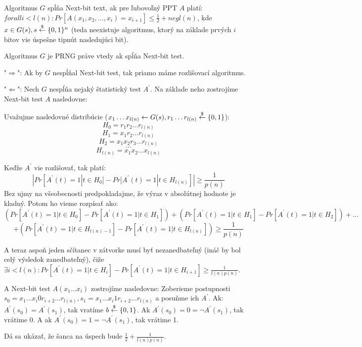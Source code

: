 \begin{definicia}
Algoritmus $G$ spĺňa Next-bit text, ak pre ľubovoľný PPT $A$ platí:
$forall i < l(n)\colon Pr[A(x_1, x_2, \dots, x_i) = x_{i+1}] \leq \frac{1}{2} + negl(n)$, kde
$x \in G(s), s \overset{\$}{\leftarrow} \{0,1\}^n$ (teda neexistuje algoritmus, ktorý na základe
prvých $i$ bitov vie úspešne tipnút nasledujúci bit).
\end{definicia}

\begin{veta}
Algoritmus $G$ je PRNG práve vtedy ak spĺňa Next-bit test.
\end{veta}

\begin{dokaz}
"$\Rightarrow$": Ak by $G$ nespĺňal Next-bit test, tak priamo máme rozlišovací algoritmus.

"$\Leftarrow$": Nech $G$ nespĺňa nejaký štatistický test $A^{'}$. Na základe neho zostrojíme Next-bit
test $A$ nasledovne:

Uvažujme nasledovné distribúcie ($x_1 \dots x_{l(n)} \leftarrow G(s), r_1 \dots r_{l(n)} \overset{\$}{\leftarrow} \{0,1\}$):
$$H_0 = r_1 r_2 \dots r_{l(n)}$$
$$H_1 = x_1 r_2 \dots r_{l(n)}$$
$$H_2 = x_1 x_2 r_3 \dots r_{l(n)}$$
$$\dots$$
$$H_{l(n)} = x_1 x_2 \dots x_{l(n)}$$

Keďže $A^{'}$ vie rozlišovať, tak platí:
$$|Pr[A^{'}(t) = 1 | t \in H_0] - Pr[A^{'}(t) = 1 | t \in H_{l(n)}]| \geq \frac{1}{p(n)}$$
Bez ujmy na všeobecnosti predpokladajme, že výraz v absolútnej hodnote je kladný.
Potom ho vieme rozpísať ako:
$$(Pr[A^{'}(t) = 1 | t \in H_0] - Pr[A^{'}(t) = 1 | t \in H_{1}]) + (Pr[A^{'}(t) = 1 | t \in H_1] - Pr[A^{'}(t) = 1 | t \in H_{2}])
+ \dots $$ $$+ (Pr[A^{'}(t) = 1 | t \in H_{l(n)-1}] - Pr[A^{'}(t) = 1 | t \in H_{l(n)}]) \geq \frac{1}{p(n)}$$

A teraz aspoň jeden sčítanec v zátvorke musí byť nezanedbateľný (ináč by bol celý výsledok zanedbateľný), čiže
$\exists i < l(n)\colon Pr[A^{'}(t) = 1 | t \in H_{i}] - Pr[A^{'}(t) = 1 | t \in H_{i+1}] \geq \frac{1}{l(n)p(n)}$.

A Next-bit test $A(x_1 \dots x_i)$ zostrojíme nasledovne:
Zoberieme postupnosti $s_0 = x_1 \dots x_i 0 r_{i+2} \dots r_{l(n)}, s_1 = x_1 \dots x_i 1 r_{i+2} \dots r_{l(n)}$
a posuňme ich $A^{'}$. Ak:
$A^{'}(s_0) = A^{'}(s_1)$, tak vratíme $b \overset{\$}{\leftarrow} \{0,1\}$. Ak $A^{'}(s_0) = 0 = \neg A^{'}(s_1)$, tak vrátime 0.
A ak $A^{'}(s_0) = 1 = \neg A^{'}(s_1)$, tak vrátime 1.

Dá sa ukázať, že šanca na úspech bude $\frac{1}{2} + \frac{1}{l(n)p(n)}$.
\end{dokaz}

